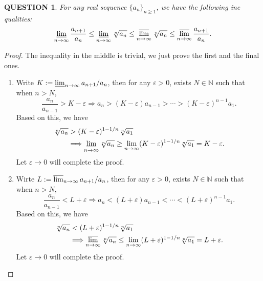 \documentclass[12pt]{article}
\renewcommand{\(}{\left(}%
\renewcommand{\)}{\right)}%
\renewcommand{\[}{\left[}%
\renewcommand{\]}{\right]}%
\newcommand{\n}{\mathbb{N}}
\newtheorem{question}{QUESTION}[section]}
\newtheorem{proof}{Proof.}}
\begin{document}
  \begin{question}
  	For any real sequence $\{a_n\}_{n\geq 1}$, we have the following ine	qualities:
  	\begin{equation*}
  		\varliminf_{n\to\infty} \frac{a_{n+1}}{a_n}\leq \varliminf_{n\to\infty}\sqrt[n]{a_n}\leq \varlimsup_{n\to\infty}\sqrt[n]{a_n}\leq \varlimsup_{n\to\infty} \frac{a_{n+1}}{a_n}.
  	\end{equation*}
  \end{question}
  \begin{proof}
  	The inequality in the middle is trivial, we just prove the first and the final ones.
  	\begin{enumerate}
  		\item Write $K:=\varliminf_{n\to\infty} a_{n+1}/a_n$, then for any $\varepsilon>0$, exists $N\in\n$ such that when $n>N$,
  		\begin{equation*}
  			\frac{a_{n}}{a_{n-1}}>K-\varepsilon\Longrightarrow a_{n}>(K-\varepsilon)a_{n-1}>\cdots>(K-\varepsilon)^{n-1}a_1.
  		\end{equation*}
		Based on this, we have
		\begin{equation*}
			\begin{split}
				\sqrt[n]{a_n}&>(K-\varepsilon)^{1-1/n}\sqrt[n]{a_1}\\
				&\Longrightarrow \varliminf_{n\to\infty}\sqrt[n]{a_n}\geq\lim_{n\to\infty}(K-\varepsilon)^{1-1/n}\sqrt[n]{a_1}=K-\varepsilon.
			\end{split}
		\end{equation*} 
		Let $\varepsilon\to0$ will complete the proof.
  		\item Wirte $L:=\varlimsup_{n\to\infty}a_{n+1}/a_n$, then for any $\varepsilon>0$, exists $N\in\n$ such that when $n>N$,
  		\begin{equation*}
  			\frac{a_{n}}{a_{n-1}}<L+\varepsilon\Longrightarrow a_{n}<(L+\varepsilon)a_{n-1}<\cdots<(L+\varepsilon)^{n-1}a_1.
  		\end{equation*}
		Based on this, we have
		\begin{equation*}
			\begin{split}
				\sqrt[n]{a_n}&<(L+\varepsilon)^{1-1/n}\sqrt[n]{a_1}\\
				&\Longrightarrow \varlimsup_{n\to\infty}\sqrt[n]{a_n}\leq\lim_{n\to\infty}(L+\varepsilon)^{1-1/n}\sqrt[n]{a_1}=L+\varepsilon.
			\end{split}
		\end{equation*} 
		Let $\varepsilon\to0$ will complete the proof.
  	\end{enumerate}
  \end{proof}
  
\end{document}
